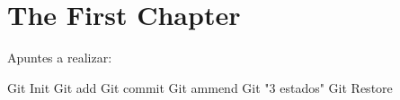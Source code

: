 \chapter{The First Chapter}
Apuntes a realizar:

Git Init
Git add
Git commit
Git ammend
Git "3 estados"
Git Restore